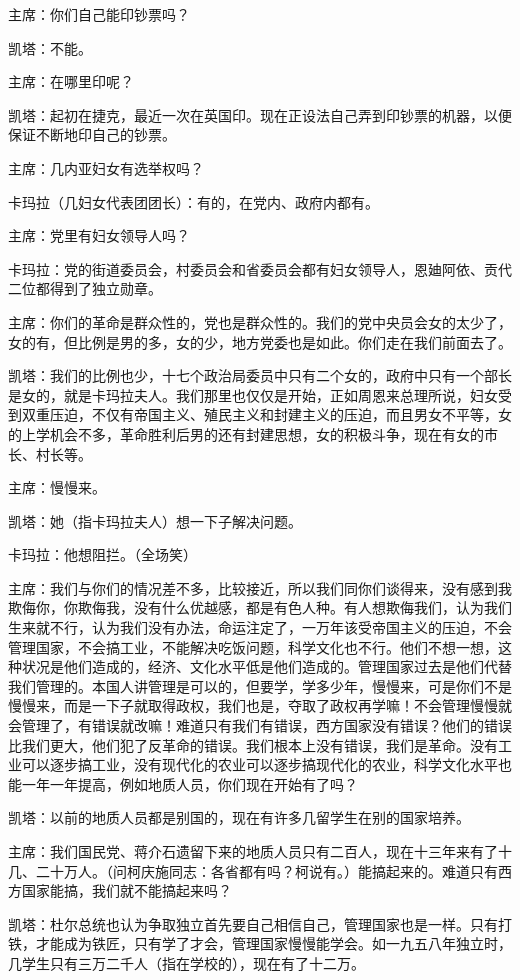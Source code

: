 主席：你们自己能印钞票吗？

凯塔：不能。

主席：在哪里印呢？

凯塔：起初在捷克，最近一次在英国印。现在正设法自己弄到印钞票的机器，以便保证不断地印自己的钞票。

主席：几内亚妇女有选举权吗？

卡玛拉（几妇女代表团团长）：有的，在党内、政府内都有。

主席：党里有妇女领导人吗？

卡玛拉：党的街道委员会，村委员会和省委员会都有妇女领导人，恩廸阿依、贡代二位都得到了独立勋章。

主席：你们的革命是群众性的，党也是群众性的。我们的党中央员会女的太少了，女的有，但比例是男的多，女的少，地方党委也是如此。你们走在我们前面去了。

凯塔：我们的比例也少，十七个政治局委员中只有二个女的，政府中只有一个部长是女的，就是卡玛拉夫人。我们那里也仅仅是开始，正如周恩来总理所说，妇女受到双重压迫，不仅有帝国主义、殖民主义和封建主义的压迫，而且男女不平等，女的上学机会不多，革命胜利后男的还有封建思想，女的积极斗争，现在有女的市长、村长等。

主席：慢慢来。

凯塔：她（指卡玛拉夫人）想一下子解决问题。

卡玛拉：他想阻拦。（全场笑）

主席：我们与你们的情况差不多，比较接近，所以我们同你们谈得来，没有感到我欺侮你，你欺侮我，没有什么优越感，都是有色人种。有人想欺侮我们，认为我们生来就不行，认为我们没有办法，命运注定了，一万年该受帝国主义的压迫，不会管理国家，不会搞工业，不能解决吃饭问题，科学文化也不行。他们不想一想，这种状况是他们造成的，经济、文化水平低是他们造成的。管理国家过去是他们代替我们管理的。本国人讲管理是可以的，但要学，学多少年，慢慢来，可是你们不是慢慢来，而是一下子就取得政权，我们也是，夺取了政权再学嘛！不会管理慢慢就会管理了，有错误就改嘛！难道只有我们有错误，西方国家没有错误？他们的错误比我们更大，他们犯了反革命的错误。我们根本上没有错误，我们是革命。没有工业可以逐步搞工业，没有现代化的农业可以逐步搞现代化的农业，科学文化水平也能一年一年提高，例如地质人员，你们现在开始有了吗？

凯塔：以前的地质人员都是别国的，现在有许多几留学生在别的国家培养。

主席：我们国民党、蒋介石遗留下来的地质人员只有二百人，现在十三年来有了十几、二十万人。（问柯庆施同志：各省都有吗？柯说有。）能搞起来的。难道只有西方国家能搞，我们就不能搞起来吗？

凯塔：杜尔总统也认为争取独立首先要自己相信自己，管理国家也是一样。只有打铁，才能成为铁匠，只有学了才会，管理国家慢慢能学会。如一九五八年独立时，几学生只有三万二千人（指在学校的），现在有了十二万。

